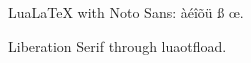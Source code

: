 \documentclass{article}
\begin{document}
LuaLaTeX with Noto Sans: àéîõü ß œ.

{\liberation Liberation Serif through luaotfload.}

\end{document}
